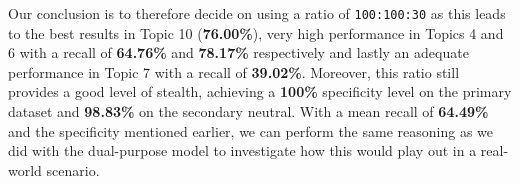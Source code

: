 Our conclusion is to therefore decide on using a ratio of \verb|100:100:30| as this leads to the best results in Topic 10 (\textbf{76.00\%}), very high performance in Topics 4 and 6 with a recall of \textbf{64.76\%} and \textbf{78.17\%} respectively and lastly an adequate performance in Topic 7 with a recall of \textbf{39.02\%}. Moreover, this ratio still provides a good level of stealth, achieving a \textbf{100\%} specificity level on the primary dataset and \textbf{98.83\%} on the secondary neutral. With a mean recall of \textbf{64.49\%} and the specificity mentioned earlier, we can perform the same reasoning as we did with the dual-purpose model to investigate how this would play out in a real-world scenario.

\begin{table}[ht]
    \centering
    \vspace{5pt}
    \caption{Example classification distributions for different levels of expected positive data out of an input of \textbf{1,000,000} samples. Specificity (\textbf{98.83\%}) and Recall (\textbf{64.49\%}) values are achieved from the multi-purpose secondary model with a training ratio of \textbf{100:100:30}.}
    \label{tab:real_world_example_combined}
\end{table}

